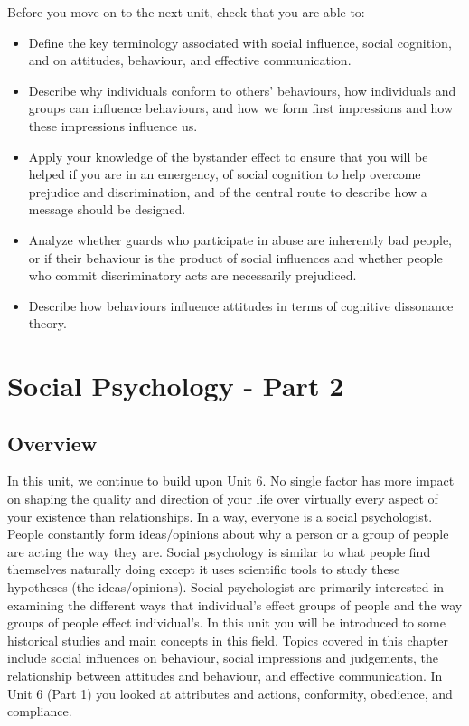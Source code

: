 \documentclass[
]{book}
\begin{document}
\begin{progress}
Before you move on to the next unit, check that you are able to:

\begin{itemize}
\item
  Define the key terminology associated with social influence, social cognition, and on attitudes, behaviour, and effective communication.
\item
  Describe why individuals conform to others' behaviours, how individuals and groups can influence behaviours, and how we form first impressions and how these impressions influence us.
\item
  Apply your knowledge of the bystander effect to ensure that you will be helped if you are in an emergency, of social cognition to help overcome prejudice and discrimination, and of the central route to describe how a message should be designed.
\item
  Analyze whether guards who participate in abuse are inherently bad people, or if their behaviour is the product of social influences and whether people who commit discriminatory acts are necessarily prejudiced.
\item
  Describe how behaviours influence attitudes in terms of cognitive dissonance theory.
\end{itemize}
\end{progress}

\hypertarget{social-psychology---part-2}{%
\chapter{Social Psychology - Part 2}\label{social-psychology---part-2}}

\hypertarget{overview-6}{%
\section*{Overview}\label{overview-6}}

In this unit, we continue to build upon Unit 6. No single factor has more impact on shaping the quality and direction of your life over virtually every aspect of your existence than relationships. In a way, everyone is a social psychologist. People constantly form ideas/opinions about why a person or a group of people are acting the way they are. Social psychology is similar to what people find themselves naturally doing except it uses scientific tools to study these hypotheses (the ideas/opinions). Social psychologist are primarily interested in examining the different ways that individual's effect groups of people and the way groups of people effect individual's. In this unit you will be introduced to some historical studies and main concepts in this field. Topics covered in this chapter include social influences on behaviour, social impressions and judgements, the relationship between attitudes and behaviour, and effective communication. In Unit 6 (Part 1) you looked at attributes and actions, conformity, obedience, and compliance.
\end{document}

